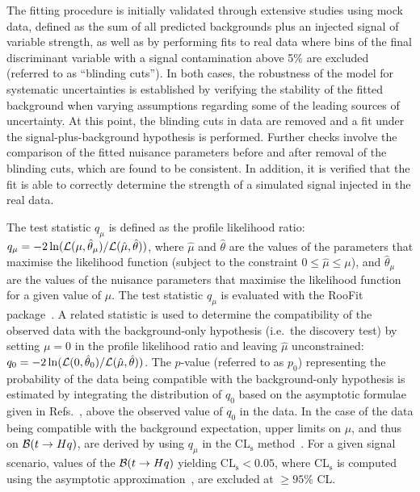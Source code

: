 The fitting procedure is initially validated through extensive studies using mock data, defined as the sum of all predicted backgrounds 
plus an injected signal of variable strength, as well as by performing fits to real data where bins of the final discriminant variable with 
a signal contamination above 5\% are excluded (referred to as ``blinding cuts'').
In both cases, the robustness of the model for systematic uncertainties is established by verifying the stability of the fitted background 
when varying assumptions regarding some of the leading sources of uncertainty. At this point, the blinding cuts in data 
are removed and a fit under the signal-plus-background hypothesis is performed. Further checks involve the comparison of the fitted 
nuisance parameters before and after removal of the blinding cuts, which are found to be consistent. In addition, it is verified that the 
fit is able to correctly determine the strength of a simulated signal injected in the real data.

The test statistic $q_\mu$ is defined as the profile likelihood ratio: 
$q_\mu = -2\ln({\cal L}(\mu,{\hat{\theta}}_\mu)/{\cal L}(\hat{\mu},\hat{\theta}))$,
where $\hat{\mu}$ and $\hat{\theta}$ are the values of the parameters that
maximise the likelihood function (subject to the constraint $0\leq \hat{\mu} \leq \mu$), and ${\hat{\theta}}_\mu$ are the values of the
nuisance parameters that maximise the likelihood function for a given value of $\mu$. 
The test statistic $q_\mu$ is evaluated with the {\textsc RooFit} package~\cite{Verkerke:2003ir,RooFitManual}.
A related statistic is used to determine the compatibility of the observed data with the background-only hypothesis (i.e.~the discovery test)  
by setting $\mu=0$ in the profile likelihood ratio and leaving $\hat{\mu}$ unconstrained: $q_0 = -2\ln({\cal L}(0,{\hat{\theta}}_0)/{\cal L}(\hat{\mu},\hat{\theta}))$.
The $p$-value (referred to as $p_0$) representing the probability of the data being compatible with the background-only hypothesis is estimated by integrating
the distribution of $q_0$ based on the asymptotic formulae given in Refs.~\cite{Cowan:2010js}, 
above the observed value of $q_0$ in the data. 
In the case of the data being compatible with the background expectation, upper limits on $\mu$, and thus on 
$\mathcal{B}(t\to Hq)$, are derived by using $q_\mu$ in the CL$_{\textrm{s}}$ method~\cite{Junk:1999kv,Read:2002hq}.
For a given signal scenario, values of the $\mathcal{B}(t\to Hq)$ yielding CL$_{\textrm{s}} < 0.05$, 
where CL$_{\textrm{s}}$ is computed using the asymptotic approximation~\cite{Cowan:2010js}, are excluded at $\geq 95\%$ CL.


